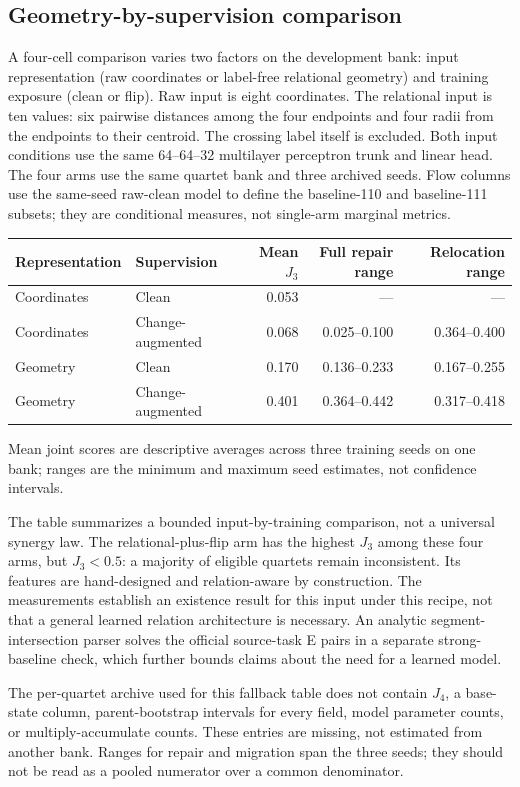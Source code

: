 \hypertarget{geometry-by-supervision-comparison}{%
\subsection{Geometry-by-supervision comparison}\label{geometry-by-supervision-comparison}}

A four-cell comparison varies two factors on the development bank: input representation (raw coordinates or label-free relational geometry) and training exposure (clean or flip). Raw input is eight coordinates. The relational input is ten values: six pairwise distances among the four endpoints and four radii from the endpoints to their centroid. The crossing label itself is excluded. Both input conditions use the same 64--64--32 multilayer perceptron trunk and linear head. The four arms use the same quartet bank and three archived seeds. Flow columns use the same-seed raw-clean model to define the baseline-110 and baseline-111 subsets; they are conditional measures, not single-arm marginal metrics.

\begin{longtable}[]{@{}llrrr@{}}
\toprule
Representation & Supervision & Mean \(J_3\) & Full repair range & Relocation range\tabularnewline
\midrule
\endhead
Coordinates & Clean & 0.053 & --- & ---\tabularnewline
Coordinates & Change-augmented & 0.068 & 0.025--0.100 & 0.364--0.400\tabularnewline
Geometry & Clean & 0.170 & 0.136--0.233 & 0.167--0.255\tabularnewline
Geometry & Change-augmented & 0.401 & 0.364--0.442 & 0.317--0.418\tabularnewline
\bottomrule
\end{longtable}

Mean joint scores are descriptive averages across three training seeds on one bank; ranges are the minimum and maximum seed estimates, not confidence intervals.

The table summarizes a bounded input-by-training comparison, not a universal synergy law. The relational-plus-flip arm has the highest \(J_3\) among these four arms, but \(J_3<0.5\): a majority of eligible quartets remain inconsistent. Its features are hand-designed and relation-aware by construction. The measurements establish an existence result for this input under this recipe, not that a general learned relation architecture is necessary. An analytic segment-intersection parser solves the official source-task E pairs in a separate strong-baseline check, which further bounds claims about the need for a learned model.

The per-quartet archive used for this fallback table does not contain \(J_4\), a base-state column, parent-bootstrap intervals for every field, model parameter counts, or multiply-accumulate counts. These entries are missing, not estimated from another bank. Ranges for repair and migration span the three seeds; they should not be read as a pooled numerator over a common denominator.

